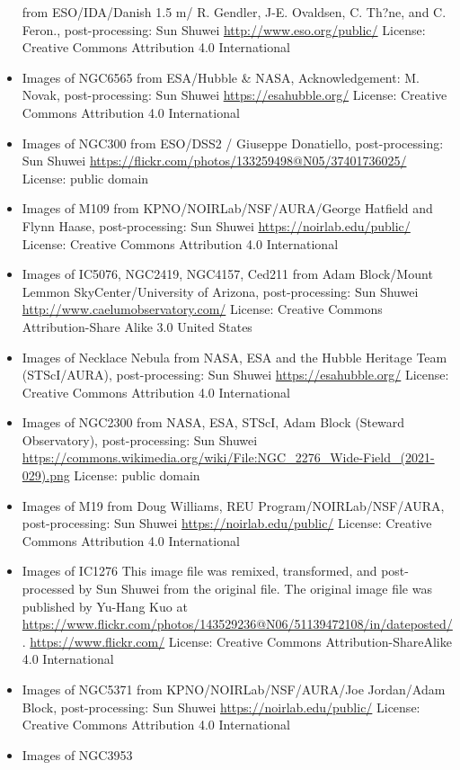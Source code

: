 \begin{itemize}
	 from ESO/IDA/Danish 1.5 m/ R. Gendler, J-E. Ovaldsen, C. Th?ne, and C. Feron., post-processing: Sun Shuwei
	 \url{http://www.eso.org/public/}
	 License: Creative Commons Attribution 4.0 International
\item Images of NGC6565
	 from ESA/Hubble \& NASA, Acknowledgement: M. Novak, post-processing: Sun Shuwei
	 \url{https://esahubble.org/}
	 License: Creative Commons Attribution 4.0 International
\item Images of NGC300
	 from ESO/DSS2 / Giuseppe Donatiello, post-processing: Sun Shuwei
	 \url{https://flickr.com/photos/133259498@N05/37401736025/}
	 License: public domain
\item Images of M109
	 from KPNO/NOIRLab/NSF/AURA/George Hatfield and Flynn Haase, post-processing: Sun Shuwei
	 \url{https://noirlab.edu/public/}
	 License: Creative Commons Attribution 4.0 International
\item Images of IC5076, NGC2419, NGC4157, Ced211
	 from Adam Block/Mount Lemmon SkyCenter/University of Arizona, post-processing: Sun Shuwei
	 \url{http://www.caelumobservatory.com/}
	 License: Creative Commons Attribution-Share Alike 3.0 United States
\item Images of Necklace Nebula
	 from NASA, ESA and the Hubble Heritage Team (STScI/AURA), post-processing: Sun Shuwei
	 \url{https://esahubble.org/}
	 License: Creative Commons Attribution 4.0 International
\item Images of NGC2300
	 from NASA, ESA, STScI, Adam Block (Steward Observatory), post-processing: Sun Shuwei
	 \url{https://commons.wikimedia.org/wiki/File:NGC_2276_Wide-Field_(2021-029).png}
	 License: public domain
\item Images of M19
	 from Doug Williams, REU Program/NOIRLab/NSF/AURA, post-processing: Sun Shuwei
	 \url{https://noirlab.edu/public/}
	 License: Creative Commons Attribution 4.0 International
\item Images of IC1276
	 This image file was remixed, transformed, and post-processed by Sun Shuwei from the original file. The original image file was published by Yu-Hang Kuo at \url{https://www.flickr.com/photos/143529236@N06/51139472108/in/dateposted/}.
	 \url{https://www.flickr.com/}
	 License: Creative Commons Attribution-ShareAlike 4.0 International 
\item Images of NGC5371
	 from KPNO/NOIRLab/NSF/AURA/Joe Jordan/Adam Block, post-processing: Sun Shuwei
	 \url{https://noirlab.edu/public/}
	 License: Creative Commons Attribution 4.0 International
\item Images of NGC3953

\end{itemize}
